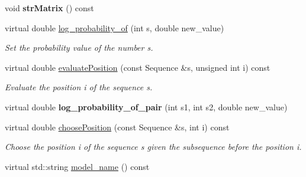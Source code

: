 \begin{DoxyCompactItemize}
\mbox{\label{classtops_1_1DiscreteIIDModel_a6792ac1608ed7841b46bf8a4a034e8fe}} 
void {\bfseries str\+Matrix} () const
\item 
\mbox{\label{classtops_1_1DiscreteIIDModel_ab1d33f6f6da4a3c655d7356887635d26}} 
virtual double \hyperlink{classtops_1_1DiscreteIIDModel_ab1d33f6f6da4a3c655d7356887635d26}{log\+\_\+probability\+\_\+of} (int s, double new\+\_\+value)
\begin{DoxyCompactList}\small\item\em Set the probability value of the number s. \end{DoxyCompactList}\item 
\mbox{\label{classtops_1_1DiscreteIIDModel_a4e556ccbe56950a4d7dd3fb8aaaff19b}} 
virtual double \hyperlink{classtops_1_1DiscreteIIDModel_a4e556ccbe56950a4d7dd3fb8aaaff19b}{evaluate\+Position} (const Sequence \&s, unsigned int i) const
\begin{DoxyCompactList}\small\item\em Evaluate the position i of the sequence s. \end{DoxyCompactList}\item 
\mbox{\label{classtops_1_1DiscreteIIDModel_abdf5a2ac3291dd78e81bd44d1366ee41}} 
virtual double {\bfseries log\+\_\+probability\+\_\+of\+\_\+pair} (int s1, int s2, double new\+\_\+value)
\item 
\mbox{\label{classtops_1_1DiscreteIIDModel_a2dbe94da17ac80a986a356de7145872b}} 
virtual double \hyperlink{classtops_1_1DiscreteIIDModel_a2dbe94da17ac80a986a356de7145872b}{choose\+Position} (const Sequence \&s, int i) const
\begin{DoxyCompactList}\small\item\em Choose the position i of the sequence s given the subsequence before the position i. \end{DoxyCompactList}\item 
\mbox{\label{classtops_1_1DiscreteIIDModel_a8ae9284850a6277e1eb893dd3fd03498}} 
virtual std\+::string \hyperlink{classtops_1_1DiscreteIIDModel_a8ae9284850a6277e1eb893dd3fd03498}{model\+\_\+name} () const

\end{DoxyCompactItemize}
